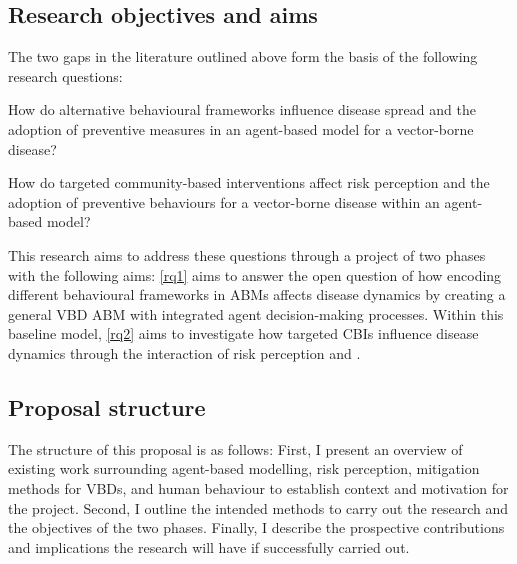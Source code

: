 \subsection{Research objectives and aims}

The two gaps in the literature outlined above form the basis of the following research questions:

\begin{questions}

\item How do alternative behavioural frameworks influence disease spread and the adoption of preventive measures in an agent-based model for a vector-borne disease?\label{rq1}

\item How do targeted community-based interventions affect risk perception and the  adoption of preventive behaviours for a vector-borne disease within an agent-based model?\label{rq2}

\end{questions}

This research aims to address these questions through a project of two phases with the following aims: \ref{rq1} aims to answer the open question of how encoding different behavioural frameworks in ABMs affects disease dynamics by creating a general VBD ABM with integrated agent decision-making processes. Within this baseline model, \ref{rq2} aims to investigate how targeted CBIs influence disease dynamics through the interaction of risk perception and .


\subsection{Proposal structure}


The structure of this proposal is as follows: First, I present an overview of existing work surrounding agent-based modelling, risk perception, mitigation methods for VBDs, and human behaviour to establish context and motivation for the project. Second, I outline the intended methods to carry out the research and the objectives of the two phases. Finally, I describe the prospective contributions and implications the research will have if successfully carried out.\vspace{.5cm}



